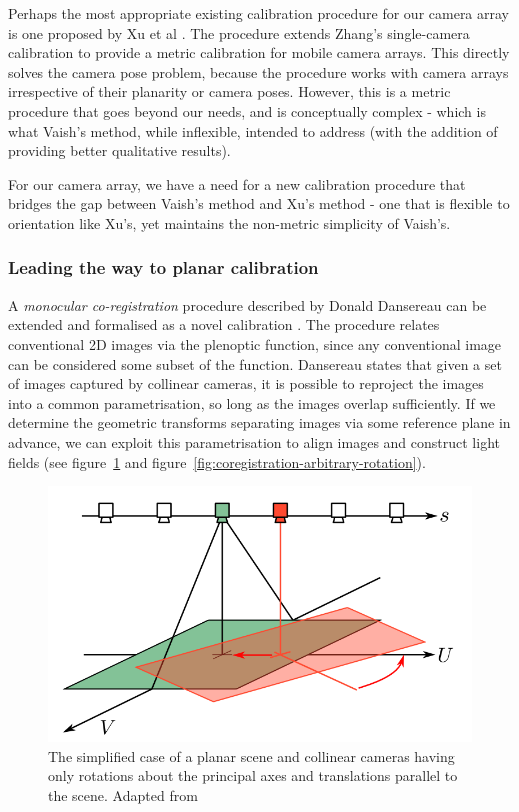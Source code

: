 \documentclass[../main.tex]{subfiles}
\begin{document}
Perhaps the most appropriate existing calibration procedure for our camera array is one proposed by Xu et al \cite{Xu2014}. The procedure extends Zhang's single-camera calibration \cite{Zhang2000} to provide a metric calibration for mobile camera arrays. This directly solves the camera pose problem, because the procedure works with camera arrays irrespective of their planarity or camera poses. However, this is a metric procedure that goes beyond our needs, and is conceptually complex - which is what Vaish's method, while inflexible, intended to address (with the addition of providing better qualitative results).

For our camera array, we have a need for a new calibration procedure that bridges the gap between Vaish's method and Xu's method - one that is flexible to orientation like Xu's, yet maintains the non-metric simplicity of Vaish's. 

\subsubsection{Leading the way to planar calibration} \label{sec:monocular-coregistration}
A \emph{monocular co-registration} procedure described by Donald Dansereau can be extended and formalised as a novel calibration \cite{dansereau2014plenoptic}. The procedure relates conventional 2D images via the plenoptic function, since any conventional image can be considered some subset of the function. Dansereau states that given a set of images captured by collinear cameras, it is possible to reproject the images into a common parametrisation, so long as the images overlap sufficiently. If we determine the geometric transforms separating images via some reference plane in advance, we can exploit this parametrisation to align images and construct light fields (see figure~\ref{fig:coregistration-principal-rotation} and figure~\ref{fig:coregistration-arbitrary-rotation}).

\begin{figure}[H]
    \centering
    \includegraphics[width=0.8\linewidth]{images/coregistration-principal-rotation}
    \caption{The simplified case of a planar scene and collinear  cameras having only rotations about the principal axes and translations parallel to the scene. Adapted from \protect{}}
    \label{fig:coregistration-principal-rotation}
\end{figure}
\end{document}
